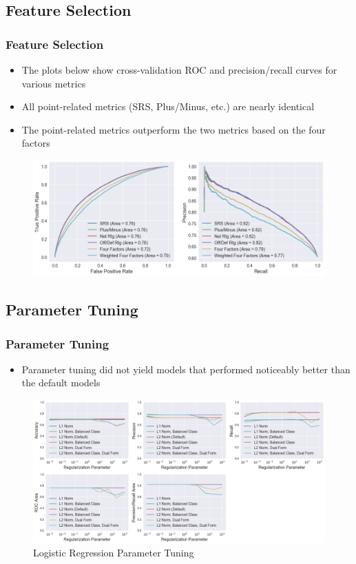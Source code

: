 \documentclass{beamer}
\begin{document}
\subsection{Feature Selection}
\begin{frame}
\frametitle{Feature Selection}
\begin{itemize}
    \item The plots below show cross-validation ROC and precision/recall curves for various metrics
    \item All point-related metrics (SRS, Plus/Minus, etc.) are nearly identical
    \item The point-related metrics outperform the two metrics based on the four factors
\end{itemize}
\begin{figure}
\includegraphics[scale=0.35]{../docs/assets/images/feature-selection/cross-validation-comparison.png}
\end{figure}
\end{frame}

\subsection{Parameter Tuning}
\begin{frame}
\frametitle{Parameter Tuning}
\begin{itemize}
    \item Parameter tuning did not yield models that performed noticeably better than the default models
\end{itemize}
\begin{figure}
\includegraphics[scale=0.3]{../docs/assets/images/parameter-tuning/logistic-regression-metrics.png}
\caption{Logistic Regression Parameter Tuning}
\end{figure}
\end{frame}
\end{document}
